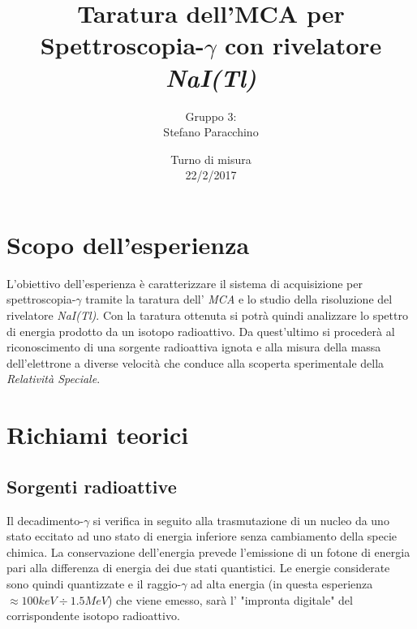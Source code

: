 \documentclass[12pt,a4paper,openright,twoside]{article}
\title{\textbf{ Taratura dell'MCA per Spettroscopia-$\gamma$ con rivelatore \textit{NaI(Tl)}}}
\date{\small{ Turno di misura\\
	22/2/2017}}
\author{Gruppo 3: \\  
		Stefano Paracchino 
		}
\numberwithin{equation}{section} %
\begin{document}
\maketitle
    

\tableofcontents                        %






\pagebreak


\section{Scopo dell'esperienza}
L'obiettivo dell'esperienza è caratterizzare il sistema di acquisizione per spettroscopia-$\gamma$ tramite la taratura dell' \textit{MCA} e lo studio della risoluzione del rivelatore \textit{NaI(Tl)}. 
Con la taratura ottenuta si potrà quindi analizzare lo spettro di energia prodotto da un isotopo radioattivo.
Da quest'ultimo si procederà al riconoscimento di una sorgente radioattiva ignota e alla misura della massa dell'elettrone a diverse velocità che conduce alla scoperta sperimentale della \textit{Relatività Speciale}.

\section{Richiami teorici}
\subsection{Sorgenti radioattive}
Il decadimento-$\gamma$ si verifica in seguito alla trasmutazione di un nucleo da uno stato eccitato ad uno stato di energia inferiore senza cambiamento della specie chimica.
La conservazione dell'energia prevede l'emissione di un fotone di energia pari alla differenza di energia dei due stati quantistici. Le energie considerate sono quindi quantizzate e il raggio-$\gamma$ ad alta energia (in questa esperienza $\approx 100 keV \div 1.5 MeV $) che viene emesso, sarà l' "impronta digitale" del corrispondente isotopo radioattivo.
\end{document}
